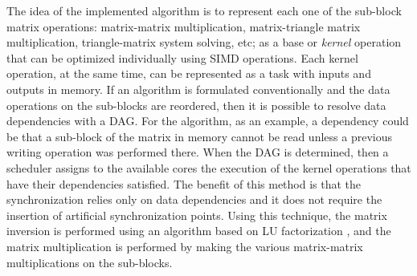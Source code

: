 The idea of the implemented algorithm is to represent each one of the
sub-block matrix operations: matrix-matrix multiplication,
matrix-triangle matrix multiplication, triangle-matrix system solving,
etc; as a base or \textit{kernel} operation that can be optimized
individually using \ac{SIMD} operations. Each kernel operation, at the
same time, can be represented as a task with inputs and outputs in memory.
If an algorithm is formulated conventionally and the data operations on the
sub-blocks are reordered, then it is possible to resolve data
dependencies with a \ac{DAG}. For the algorithm, as an example, a dependency
could be that a sub-block of the matrix in memory cannot be read unless
a previous writing operation was performed there. When the
\ac{DAG} is determined, then a scheduler assigns to the available cores the
execution of the kernel operations that have their dependencies satisfied.
The benefit of this method is that the synchronization relies only on
data dependencies and it does not require the insertion of artificial
synchronization points. Using this technique, the matrix inversion is
performed using an algorithm based on LU factorization
\cite{Dongarra:2011:HPM:2132876.2132885}, and the matrix multiplication is
performed by making the various matrix-matrix multiplications on the
sub-blocks.
